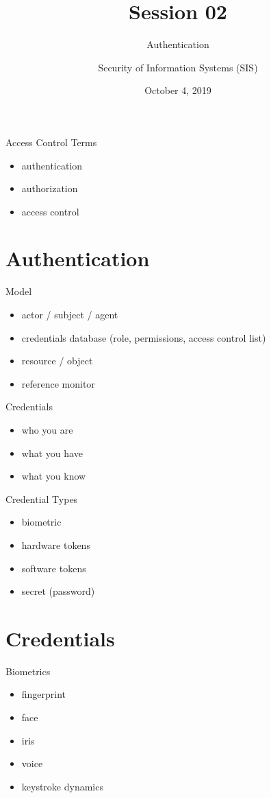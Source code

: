 \documentclass{curs}
\title[Session 02]{Session 02}
\subtitle{Authentication}
\author{Security of Information Systems (SIS)}
\date{October 4, 2019}
\begin{document}
\frame{\titlepage}


\begin{frame}{Access Control Terms}
  \begin{itemize}
    \item authentication
    \item authorization
    \item access control
  \end{itemize}
\end{frame}

\section{Authentication}

\begin{frame}{Model}
  \begin{itemize}
    \item actor / subject / agent
    \item credentials database (role, permissions, access control list)
    \item resource / object
    \item reference monitor
  \end{itemize}
\end{frame}

\begin{frame}{Credentials}
  \begin{itemize}
    \item who you are
    \item what you have
    \item what you know
  \end{itemize}
\end{frame}

\begin{frame}{Credential Types}
  \begin{itemize}
    \item biometric
    \item hardware tokens
    \item software tokens
    \item secret (password)
  \end{itemize}
\end{frame}


\section{Credentials}

\begin{frame}{Biometrics}
  \begin{itemize}
    \item fingerprint
    \item face
    \item iris
    \item voice
    \item keystroke dynamics
  \end{itemize}
\end{frame}
\end{document}
